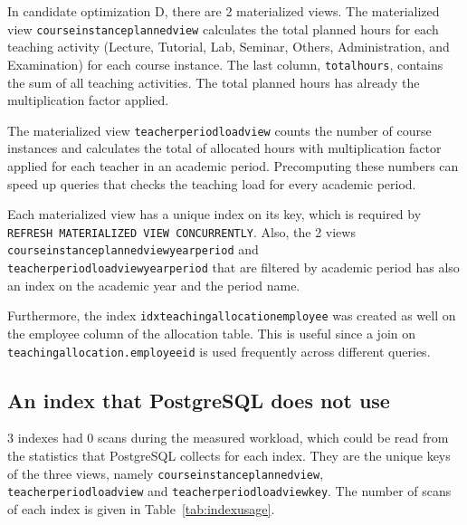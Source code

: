 \documentclass[a4paper]{scrartcl}
\renewcommand{\_}{\textunderscore\allowbreak}
\begin{document}
In candidate optimization D, there are 2 materialized views. The materialized view \texttt{course\_instance\_planned\_view} calculates the total planned hours for each teaching activity (Lecture, Tutorial, Lab, Seminar, Others, Administration, and Examination) for each course instance. The last column, \texttt{total\_hours}, contains the sum of all teaching activities. The total planned hours has already the multiplication factor applied.

The materialized view \texttt{teacher\_period\_load\_view} counts the number of course instances and calculates the total of allocated hours with multiplication factor applied for each teacher in an academic period. Precomputing these numbers can speed up queries that checks the teaching load for every academic period.

Each materialized view has a unique index on its key, which is required by \texttt{REFRESH MATERIALIZED VIEW CONCURRENTLY}. Also, the 2 views \texttt{course\_instance\_planned\_view\_year\_period} and \texttt{teacher\_period\_load\_view\_year\_period} that are filtered by academic period has also an index on the academic year and the period name.

Furthermore, the index \texttt{idx\_teaching\_allocation\_employee} was created as well on the employee column of the allocation table. This is useful since a join on \texttt{teaching\_allocation.employee\_id} is used frequently across different queries.

\subsection{An index that PostgreSQL does not use}

3 indexes had 0 scans during the measured workload, which could be read from the statistics that PostgreSQL collects for each index. They are the unique keys of the three views, namely \texttt{course\_instance\_planned\_view}, \texttt{teacher\_period\_load\_view} and \texttt{teacher\_period\_load\_view\_key}. The number of scans of each index is given in Table~\ref{tab:indexusage}.
\end{document}
